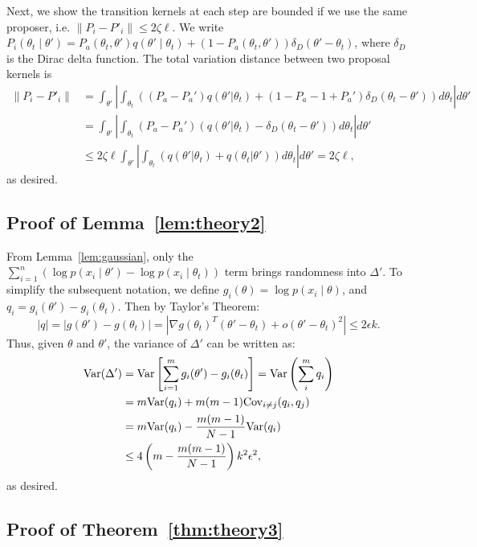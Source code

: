 \documentclass{article}
\begin{document}
Next, we show the transition kernels at each step are bounded if we use the same proposer, i.e.
$\|P_i - P'_i\| \leq 2\zeta \ell$. We write $P_i(\theta_t \mid \theta') = P_a(\theta_t, \theta')
q(\theta'\mid \theta_t) + (1-P_a(\theta_t,\theta')) \delta_D(\theta' - \theta_t)$, where $\delta_D$
is the Dirac delta function. The total variation distance between two proposal kernels is
\begin{align*}
\|P_i - P'_i \| &= \int_{\theta'} \left| \int_{\theta_t}((P_a-P_a') q(\theta'|\theta_t) + (1-P_a - 1+P_a') \delta_D(\theta_t -\theta')) d\theta_t  \right| d\theta' \\
& = \int_{\theta'} \left| \int_{\theta_t} (P_a- P_a')(q(\theta'|\theta_t) - \delta_D(\theta_t - \theta')) d\theta_t \right|  d\theta'\\ 
& \leq 2 \zeta \ell \int_{\theta'} \left| \int_{\theta_t}(q(\theta'|\theta_t) + q(\theta_t|\theta')) d\theta_t \right| d\theta'= 2 \zeta \ell,
\end{align*}
as desired.

\subsection{Proof of Lemma~\ref{lem:theory2}}\label{app:theory2}

From Lemma~\ref{lem:gaussian}, only the $\sum_{i=1}^n (\log p(x_i\mid \theta') - \log p(x_i\mid
\theta_t))$ term brings randomness into $\Delta'$. To simplify the subsequent notation, we define
$g_i(\theta) = \log p(x_i\mid \theta)$, and $q_i = g_i(\theta') - g_i(\theta_t)$. Then by Taylor's Theorem:
\[
|q| = |g(\theta') - g(\theta_t)| = |\nabla g(\theta_t)^T(\theta' - \theta_t) + o(\theta' - \theta_t)^2| \leq 2\epsilon k.
\]
Thus, given $\theta$ and $\theta'$, the variance of $\Delta'$ can be written as:
\begin{align*}
{\rm Var}(\Delta') &= {\rm Var}\left[\sum_{i=1}^m g_i(\theta') - g_i(\theta_t)\right] = {\rm Var}\left(\sum_i^m q_i\right) \\
&= m {\rm Var} (q_i) + m(m-1) {\rm Cov}_{i \neq j}(q_i,q_j) \\
&= m{\rm Var}(q_i) - \frac{m(m-1)}{N-1} {\rm Var}(q_i) \\
&\leq 4\left(m - \frac{m(m-1)}{N-1}\right)k^2 \epsilon^2,
\end{align*}
as desired.

\subsection{Proof of Theorem~\ref{thm:theory3}}\label{app:theory3}
\end{document}
